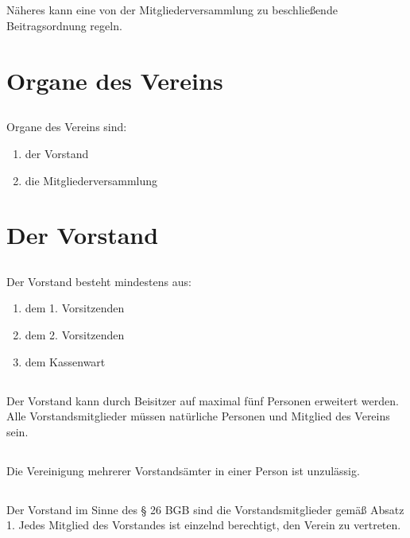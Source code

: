 \documentclass[12pt]{article}
\begin{document}
\subsection{}
Näheres kann eine von der Mitgliederversammlung zu beschließende Beitragsordnung regeln.

\section{Organe des Vereins}
\subsection{}
Organe des Vereins sind:
\begin{enumerate}
    \item der Vorstand
    \item die Mitgliederversammlung
\end{enumerate}

\section{Der Vorstand}
\subsection{}
Der Vorstand besteht mindestens aus:
\begin{enumerate}
    \item dem 1. Vorsitzenden
    \item dem 2. Vorsitzenden
    \item dem Kassenwart
\end{enumerate}
\subsection{}
Der Vorstand kann durch Beisitzer auf maximal fünf Personen erweitert werden. Alle Vorstandsmitglieder müssen natürliche Personen und Mitglied des Vereins sein.
\subsection{}
Die Vereinigung mehrerer Vorstandsämter in einer Person ist unzulässig.
\subsection{}
Der Vorstand im Sinne des § 26 BGB sind die Vorstandsmitglieder gemäß Absatz 1. Jedes Mitglied des Vorstandes ist einzelnd berechtigt, den Verein zu vertreten. 
\end{document}
